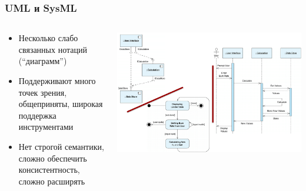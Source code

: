 \documentclass{../mcsslides}
\begin{document}
    \begin{frame}
        \frametitle{UML и SysML}
        \begin{columns}
            \begin{column}{0.4\textwidth}
                \begin{small}
                    \begin{itemize}
                        \item Несколько слабо связанных нотаций (``диаграмм'')
                        \item Поддерживают много точек зрения, общеприняты, широкая поддержка инструментами
                        \item Нет строгой семантики, сложно обеспечить консистентность, сложно расширять
                    \end{itemize}
                \end{small}
            \end{column}
            \begin{column}{0.6\textwidth}
                \begin{center}
                    \includegraphics[width=\textwidth]{uml.png}
                \end{center}
            \end{column}
        \end{columns}
    \end{frame}
\end{document}
